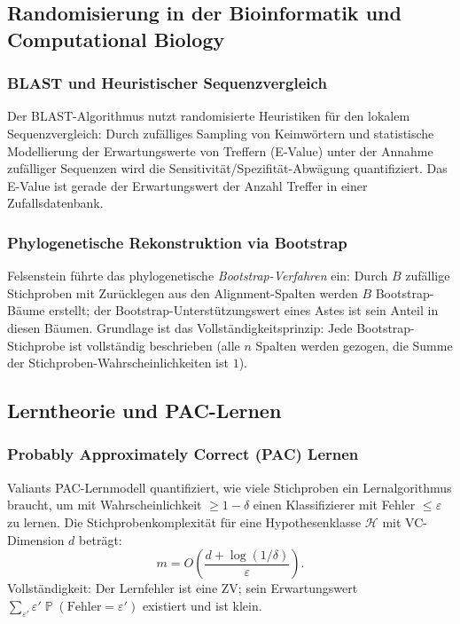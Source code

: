 ﻿\documentclass[12pt,a4paper]{article}
\theoremstyle{definition}
\theoremstyle{plain}
\theoremstyle{remark}
\DeclareMathOperator{\Prob}{\mathbb{P}}
\begin{document}
\subsection{Randomisierung in der Bioinformatik und Computational Biology}

\subsubsection{BLAST und Heuristischer Sequenzvergleich}
Der BLAST-Algorithmus \cite{altschul1990basic} nutzt randomisierte Heuristiken
für den lokalem Sequenzvergleich: Durch zufälliges Sampling von Keimwörtern
und statistische Modellierung der Erwartungswerte von Treffern (E-Value)
unter der Annahme zufälliger Sequenzen wird die Sensitivität/Spezifität-Abwägung
quantifiziert. Das E-Value ist gerade der Erwartungswert der Anzahl Treffer
in einer Zufallsdatenbank.

\subsubsection{Phylogenetische Rekonstruktion via Bootstrap}
Felsenstein \cite{felsenstein1985confidence} führte das phylogenetische
\emph{Bootstrap-Verfahren} ein: Durch $B$ zufällige Stichproben mit Zurücklegen
aus den Alignment-Spalten werden $B$ Bootstrap-Bäume erstellt; der
Bootstrap-Unterstützungswert eines Astes ist sein Anteil in diesen Bäumen.
Grundlage ist das Vollständigkeitsprinzip: Jede Bootstrap-Stichprobe ist
vollständig beschrieben (alle $n$ Spalten werden gezogen, die Summe der
Stichproben-Wahrscheinlichkeiten ist $1$).

\subsection{Lerntheorie und PAC-Lernen}

\subsubsection{Probably Approximately Correct (PAC) Lernen}
Valiants PAC-Lernmodell \cite{valiant1984theory} quantifiziert, wie viele
Stichproben ein Lernalgorithmus braucht, um mit Wahrscheinlichkeit $\geq 1-\delta$
einen Klassifizierer mit Fehler $\leq \varepsilon$ zu lernen. Die
Stichprobenkomplexität für eine Hypothesenklasse $\mathcal{H}$ mit
VC-Dimension $d$ beträgt:
\[
  m = O\!\left(\frac{d + \log(1/\delta)}{\varepsilon}\right).
\]
Vollständigkeit: Der Lernfehler ist eine ZV; sein Erwartungswert
$\sum_{\varepsilon'} \varepsilon' \Prob(\text{Fehler}=\varepsilon')$ existiert
und ist klein.
\end{document}
